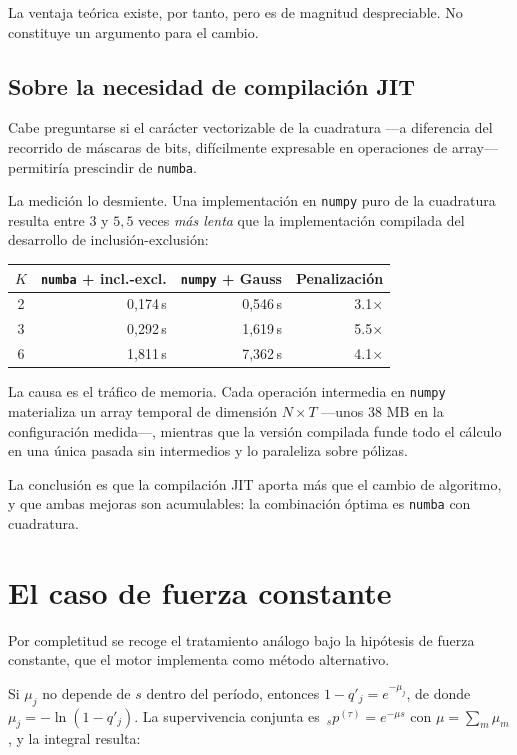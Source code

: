 \documentclass[a4paper, 12pt]{article}
\begin{document}
La ventaja teórica existe, por tanto, pero es de magnitud despreciable. No constituye un argumento para el cambio.

\subsection{Sobre la necesidad de compilación JIT}

Cabe preguntarse si el carácter vectorizable de la cuadratura —a diferencia del recorrido de máscaras de bits, difícilmente expresable en operaciones de array— permitiría prescindir de \texttt{numba}.

La medición lo desmiente. Una implementación en \texttt{numpy} puro de la cuadratura resulta entre $3$ y $5{,}5$ veces \emph{más lenta} que la implementación compilada del desarrollo de inclusión-exclusión:

\begin{center}
\begin{tabular}{crrr}
\toprule
$K$ & \texttt{numba} + incl.-excl. & \texttt{numpy} + Gauss & Penalización \\
\midrule
2 & 0,174\,s & 0,546\,s & 3.1$\times$ \\
3 & 0,292\,s & 1,619\,s & 5.5$\times$ \\
6 & 1,811\,s & 7,362\,s & 4.1$\times$ \\
\bottomrule
\end{tabular}
\end{center}

La causa es el tráfico de memoria. Cada operación intermedia en \texttt{numpy} materializa un array temporal de dimensión $N \times T$ —unos $38$ MB en la configuración medida—, mientras que la versión compilada funde todo el cálculo en una única pasada sin intermedios y lo paraleliza sobre pólizas.

La conclusión es que la compilación JIT aporta más que el cambio de algoritmo, y que ambas mejoras son acumulables: la combinación óptima es \texttt{numba} con cuadratura.

\newpage

\section{El caso de fuerza constante}

Por completitud se recoge el tratamiento análogo bajo la hipótesis de fuerza constante, que el motor implementa como método alternativo.

Si $\mu_j$ no depende de $s$ dentro del período, entonces $1 - q'_j = e^{-\mu_j}$, de donde $\mu_j = -\ln(1-q'_j)$. La supervivencia conjunta es $\,_sp^{(\tau)} = e^{-\mu s}$ con $\mu = \sum_m \mu_m$, y la integral resulta:
\end{document}
